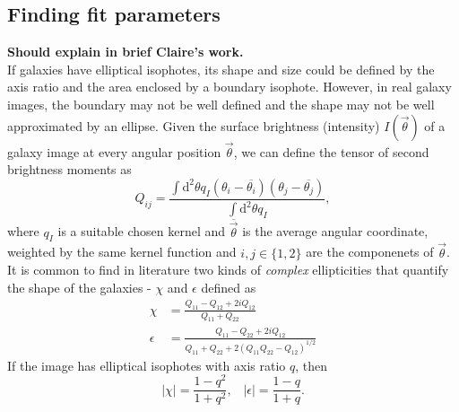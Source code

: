 \documentclass[twocolumn,useAMS,usenatbib]{mn2e}
\newcommand{\rmd}{\mathrm{d}}
\begin{document}
\subsection{Finding fit parameters}
\label{sub:axisratio}
{\bf Should explain in brief Claire's work.} \\
If galaxies have elliptical isophotes, its shape and size could be defined by the axis ratio and the area enclosed by a boundary isophote. However, in real galaxy images,
the boundary may not be well defined and the shape may not be well approximated by an ellipse. Given the surface brightness (intensity) $I(\vec{\theta})$ of a galaxy image at every angular position $\vec{\theta}$,
we can define the tensor of second brightness moments as
\begin{equation}
 Q_{ij} = \frac{\int\rmd^2\theta q_I (\theta_i - \overline{\theta_i})(\theta_j - \overline{\theta_j})}{\int\rmd^2\theta q_I},
\end{equation}
where $q_I$ is a suitable chosen kernel and $\overline{\vec{\theta}}$ is the average angular coordinate, weighted by the same kernel function and $i,j\in\lbrace 1,2 \rbrace$ are the componenets of $\vec{\theta}$.
It is common to find in literature two kinds of \emph{complex }ellipticities that quantify the shape of the galaxies - $\chi$ and $\epsilon$ defined as
\begin{align}
 \chi &= \frac{Q_{11}-Q_{12}+2iQ_{12}}{Q_{11}+Q_{22}} \\ \epsilon &= \frac{Q_{11}-Q_{22}+2iQ_{12}}{Q_{11}+Q_{22}+2(Q_{11}Q_{22}-Q_{12})^{1/2}}
\end{align}
If the image has elliptical isophotes with axis ratio $q$, then 
\begin{equation}
 |\chi| = \frac{1-q^2}{1+q^2}, \;\;\; |\epsilon| = \frac{1-q}{1+q}. 
\end{equation}
\end{document}
